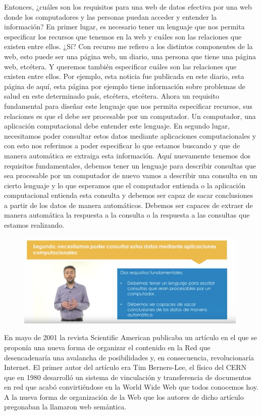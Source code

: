 Entonces, ¿cuáles son los requisitos para una web de datos efectiva por una web donde los computadores y las personas puedan acceder y entender la información? En primer lugar, es necesario tener un lenguaje que nos permita especificar los recursos que tenemos en la web y cuáles son las relaciones que existen entre ellos. ¿Sí? Con recurso me refiero a los distintos componentes de la web, esto puede ser una página web, un diario, una persona que tiene una página web, etcétera. Y queremos también especificar cuáles son las relaciones que existen entre ellos. Por ejemplo, esta noticia fue publicada en este diario, esta página de aquí, esta página por ejemplo tiene información sobre problemas de salud en este determinado país, etcétera, etcétera. Ahora un requisito fundamental para diseñar este lenguaje que nos permita especificar recursos, sus relaciones es que el debe ser procesable por un computador. Un computador, una aplicación computacional debe entender este lenguaje. En segundo lugar, necesitamos poder consultar estos datos mediante aplicaciones computacionales y con esto nos referimos a poder especificar lo que estamos buscando y que de manera automática se extraiga esta información. Aquí nuevamente tenemos dos requisitos fundamentales, debemos tener un lenguaje para describir consultas que sea procesable por un computador de nuevo vamos a describir una consulta en un cierto lenguaje y lo que esperamos que el computador entienda o la aplicación computacional entienda esta consulta y debemos ser capaz de sacar conclusiones a partir de los datos de manera automáticos. Debemos ser capaces de extraer de manera automática la respuesta a la consulta o la respuesta a las consultas que estamos realizando.

 \begin{figure}[H]
	\centering
	\includegraphics[height=4.5cm]{imagenes/capitulo3/7}
	\caption{}
\end{figure}


En mayo de 2001 la revista Scientific American publicaba un artículo en el que se proponía una nueva forma de organizar el contenido en la Red que desencadenaría una avalancha de posibilidades y, en consecuencia, revolucionaría Internet. El primer autor del artículo era Tim Berners-Lee, el físico del CERN que en 1980 desarrolló un sistema de vinculación y transferencia de documentos en red que acabó convirtiéndose en la World Wide Web que todos conocemos hoy. A la nueva forma de organización de la Web que los autores de dicho artículo pregonaban la llamaron web semántica. %

